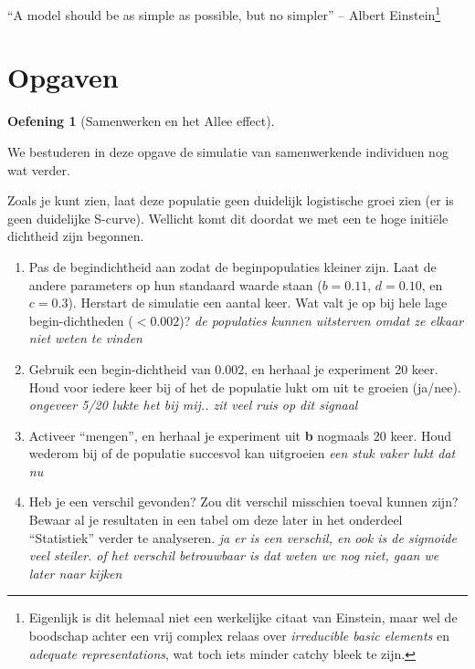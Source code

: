 \documentclass[
  a4paper,
]{scrbook}
\providecommand{\tightlist}{%
  \setlength{\itemsep}{0pt}\setlength{\parskip}{0pt}}\usepackage{longtable,booktabs,array}
\theoremstyle{definition}
\newtheorem{exercise}{Oefening}[chapter]
\theoremstyle{remark}
\begin{document}
``A model should be as simple as possible, but no simpler'' -- Albert
Einstein\footnote{Eigenlijk is dit helemaal niet een werkelijke citaat
  van Einstein, maar wel de boodschap achter een vrij complex relaas
  over \emph{irreducible basic elements} en \emph{adequate
  representations}, wat toch iets minder catchy bleek te zijn.}

\section{Opgaven}\label{opgaven-6}

\begin{exercise}[Samenwerken en het Allee
effect]\protect\hypertarget{exr-samenwerkenallee}{}\label{exr-samenwerkenallee}

We bestuderen in deze opgave de simulatie van samenwerkende individuen
nog wat verder.

Zoals je kunt zien, laat deze populatie geen duidelijk logistische groei
zien (er is geen duidelijke S-curve). Wellicht komt dit doordat we met
een te hoge initiële dichtheid zijn begonnen.

\begin{enumerate}
\def\labelenumi{\alph{enumi}.}
\tightlist
\item
  Pas de begindichtheid aan zodat de beginpopulaties kleiner zijn. Laat
  de andere parameters op hun standaard waarde staan (\(b=0.11\),
  \(d=0.10\), en \(c=0.3\)). Herstart de simulatie een aantal keer. Wat
  valt je op bij hele lage begin-dichtheden (\(<0.002\))? \emph{de
  populaties kunnen uitsterven omdat ze elkaar niet weten te vinden}
\item
  Gebruik een begin-dichtheid van \(0.002\), en herhaal je experiment 20
  keer. Houd voor iedere keer bij of het de populatie lukt om uit te
  groeien (ja/nee). \emph{ongeveer 5/20 lukte het bij mij.. zit veel
  ruis op dit signaal}
\item
  Activeer ``mengen'', en herhaal je experiment uit \textbf{b} nogmaals
  20 keer. Houd wederom bij of de populatie succesvol kan uitgroeien
  \emph{een stuk vaker lukt dat nu}
\item
  Heb je een verschil gevonden? Zou dit verschil misschien toeval kunnen
  zijn? Bewaar al je resultaten in een tabel om deze later in het
  onderdeel ``Statistiek'' verder te analyseren. \emph{ja er is een
  verschil, en ook is de sigmoide veel steiler. of het verschil
  betrouwbaar is dat weten we nog niet, gaan we later naar kijken}
\end{enumerate}

\end{exercise}
\end{document}
